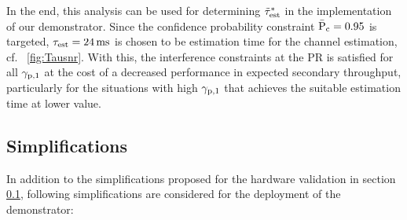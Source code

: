 In the end, this analysis can be used for determining $\tilde{\tau}^*_{\text{est}}$ in the implementation of our demonstrator. Since the confidence probability constraint $\bar{\text{P}}_{\text{c}} = 0.95$ is targeted, $\tau_{\text{est}} = \SI{24}{ms}$ is chosen to be estimation time for the channel estimation, cf. \figurename~\ref{fig:Tausnr}. With this, the interference constraints at the PR is satisfied for all ${\gamma}_{\text{p,1}}$ at the cost of a decreased performance in expected secondary throughput, particularly for the situations with high ${\gamma}_{\text{p,1}}$ that achieves the suitable estimation time at lower value.


\subsection{Simplifications}
\label{ssec:simp2}
In addition to the simplifications proposed for the hardware validation in section \ref{ssec:simp2}, following simplifications are considered for the deployment of the demonstrator: 

